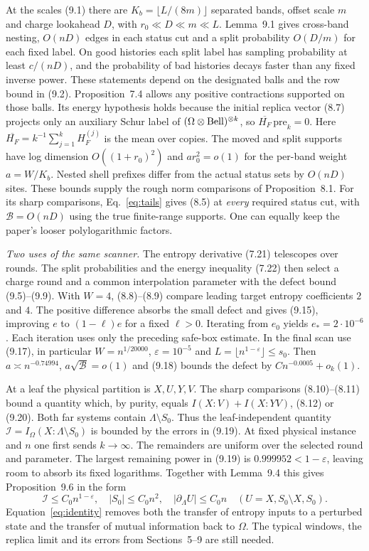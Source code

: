 \documentclass[aps,prb,onecolumn,10pt,nofootinbib]{revtex4-2}
\newcommand{\MI}{\mathcal I}
\begin{document}
At the scales (9.1) there are $K_b=\lfloor L/(8m)\rfloor$ separated bands, offset scale $m$ and charge lookahead $D$, with $r_0\ll D\ll m\ll L$. Lemma~9.1 gives cross-band nesting, $O(nD)$ edges in each status cut and a split probability $O(D/m)$ for each fixed label. On good histories each split label has sampling probability at least $c/(nD)$, and the probability of bad histories decays faster than any fixed inverse power. These statements depend on the designated balls and the row bound in (9.2). Proposition~7.4 allows any positive contractions supported on those balls. Its energy hypothesis holds because the initial replica vector (8.7) projects only an auxiliary Schur label of $(\Omega\otimes{\rm Bell})^{\otimes k}$, so $\overline{H_F}\,\mathrm{pre}_k=0$. Here $\overline{H_F}=k^{-1}\sum_{j=1}^k H_F^{(j)}$ is the mean over copies. The moved and split supports have log dimension $O((1+r_0)^2)$ and $ar_0^2=o(1)$ for the per-band weight $a=W/K_b$. Nested shell prefixes differ from the actual status sets by $O(nD)$ sites. These bounds supply the rough norm comparisons of Proposition~8.1. For its sharp comparisons, Eq.~\eqref{eq:tails} gives (8.5) at \emph{every} required status cut, with $\mathcal B=O(nD)$ using the true finite-range supports. One can equally keep the paper's looser polylogarithmic factors.

\emph{Two uses of the same scanner.}
The entropy derivative (7.21) telescopes over rounds. The split probabilities and the energy inequality (7.22) then select a charge round and a common interpolation parameter with the defect bound (9.5)--(9.9). With $W=4$, (8.8)--(8.9) compare leading target entropy coefficients $2$ and $4$. The positive difference absorbs the small defect and gives (9.15), improving $e$ to $(1-\ell)e$ for a fixed $\ell>0$. Iterating from $e_0$ yields $e_*=2\cdot10^{-6}$. Each iteration uses only the preceding safe-box estimate. In the final scan use (9.17), in particular $W=n^{1/20000}$, $\varepsilon=10^{-5}$ and $L=\lfloor n^{1-\varepsilon}\rfloor\le s_0$. Then $a\asymp n^{-0.74994}$, $a\sqrt{\mathcal B}=o(1)$ and (9.18) bounds the defect by $C n^{-0.0005}+o_k(1)$.

At a leaf the physical partition is $X,U,Y,V$. The sharp comparisons (8.10)--(8.11) bound a quantity which, by purity, equals $I(X:V)+I(X:YV)$, (8.12) or (9.20). Both far systems contain $\Lambda\setminus S_0$. Thus the leaf-independent quantity $\MI=I_\Omega(X:\Lambda\setminus S_0)$ is bounded by the errors in (9.19). At fixed physical instance and $n$ one first sends $k\to\infty$. The remainders are uniform over the selected round and parameter. The largest remaining power in (9.19) is $0.999952<1-\varepsilon$, leaving room to absorb its fixed logarithms. Together with Lemma~9.4 this gives Proposition~9.6 in the form
\begin{equation}
 \MI\le C_0 n^{1-\varepsilon},\quad |S_0|\le C_0n^2,\quad
 |\partial_\Lambda U|\le C_0 n\quad(U=X,S_0\setminus X,S_0).
 \label{eq:collar}
\end{equation}
Equation~\eqref{eq:identity} removes both the transfer of entropy inputs to a perturbed state and the transfer of mutual information back to $\Omega$. The typical windows, the replica limit and its errors from Sections~5--9 are still needed.
\end{document}
